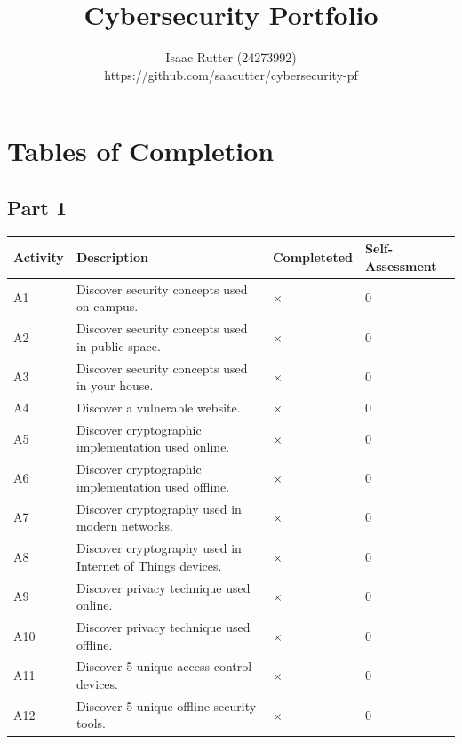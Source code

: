 \documentclass[titlepage]{article}
\title{\textbf{Cybersecurity Portfolio}}
\author{Isaac Rutter (24273992) \\ https://github.com/saacutter/cybersecurity-pf}
\date{}
\begin{document}
    \maketitle

    \newpage

    \centering\section*{Tables of Completion}

    \bigskip

    \centering\subsection*{Part 1}
        \begin{tabular}{ |p{4em}|p{30em}|C{6em}|C{5em}| }
            \hline
            Activity & Description & Completeted & Self-Assessment \\
            \hline
            A1 & Discover security concepts used on campus. & $\times$ & 0 \\
            \hline
            A2 & Discover security concepts used in public space. & $\times$ & 0 \\
            \hline
            A3 & Discover security concepts used in your house. & $\times$ & 0 \\
            \hline
            A4 & Discover a vulnerable website. & $\times$ & 0 \\
            \hline
            A5 & Discover cryptographic implementation used online. & $\times$ & 0 \\
            \hline
            A6 & Discover cryptographic implementation used offline. & $\times$ & 0 \\
            \hline
            A7 & Discover cryptography used in modern networks. & $\times$ & 0 \\
            \hline
            A8 & Discover cryptography used in Internet of Things devices. & $\times$ & 0 \\
            \hline
            A9 & Discover privacy technique used online. & $\times$ & 0 \\
            \hline
            A10 & Discover privacy technique used offline. & $\times$ & 0 \\
            \hline
            A11 & Discover 5 unique access control devices. & $\times$ & 0 \\
            \hline
            A12 & Discover 5 unique offline security tools. & $\times$ & 0 \\

\end{tabular}
\end{document}
